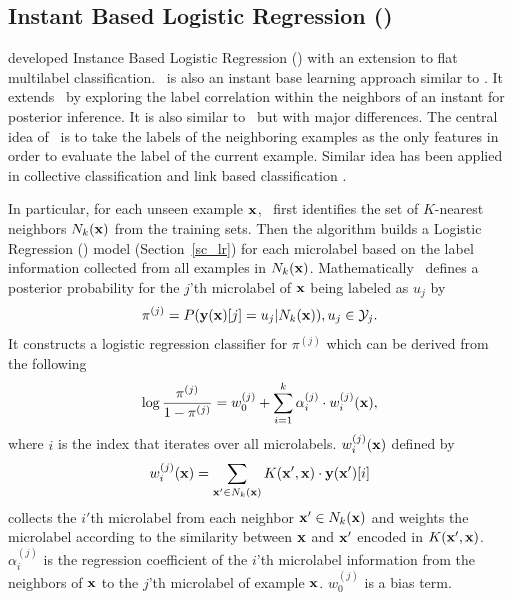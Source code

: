 {%
%
\subsection{Instant Based Logistic Regression (\iblr)} \label{sc_iblr}

\citet{Cheng09combining} developed Instance Based Logistic Regression (\iblr) with an extension to flat multilabel classification.
\iblr\ is also an instant base learning approach \citep{Aha91instance} similar to \mlknn.
It extends \mlknn\ by exploring the label correlation within the neighbors of an instant for posterior inference.
It is also similar to \cc\ but with major differences.
The central idea of \iblr\ is to take the labels of the neighboring examples as the only features in order to evaluate the label of the current example.
Similar idea has been applied in collective classification \citep{Ghamrawi05collective} and link based classification \citep{Getoor05link, Getoor07introduction}.

In particular, for each unseen example $\mathbf {x}$, \iblr\ first identifies the set of $K$-nearest neighbors $N_k(\mathbf {x})$ from the training sets.
Then the algorithm builds a Logistic Regression (\lr) model (Section~\ref{sc_lr}) for each microlabel based on the label information collected from all examples in $N_k(\mathbf {x})$.
Mathematically \iblr\ defines a posterior probability for the $j$'th microlabel of $\mathbf {x}$ being labeled as $u_j$ by
\begin{align*}
	\pi^{(j)} = P( \mathbf {y}(\mathbf {x})[j]=u_j | N_k(\mathbf {x})), u_j\in\mathcal{Y}_j.
\end{align*}
It constructs a logistic regression classifier for $\pi^{(j)}$ which can be derived from the following 
\begin{align*}
	\log\frac{\pi^{(j)}}{1-\pi^{(j)}} = w_0^{(j)} + \sum_{i=1}^{k}\alpha_i^{(j)}\cdot w_{i}^{(j)}(\mathbf {x}),
\end{align*}
where $i$ is the index that iterates over all microlabels.
$w_i^{(j)}(\mathbf {x})$ defined by 
\begin{align*}
	w_i^{(j)}(\mathbf {x}) = \sum_{\mathbf {x}'\in N_k(\mathbf {x})}K(\mathbf {x}',\mathbf {x})\cdot \mathbf {y}(\mathbf {x}')[i]
\end{align*}
collects the $i'$th microlabel from each neighbor $\mathbf {x}'\in N_k(\mathbf {x})$ and weights the microlabel according to the similarity between $\mathbf {x}$ and $\mathbf {x}'$ encoded in $K(\mathbf {x}',\mathbf {x})$.
$\alpha_i^{(j)}$ is the regression coefficient of the $i$'th microlabel information from the neighbors of $\mathbf {x}$ to the $j$'th microlabel of example $\mathbf {x}$.
$w_0^{(j)}$ is a bias term.



}
